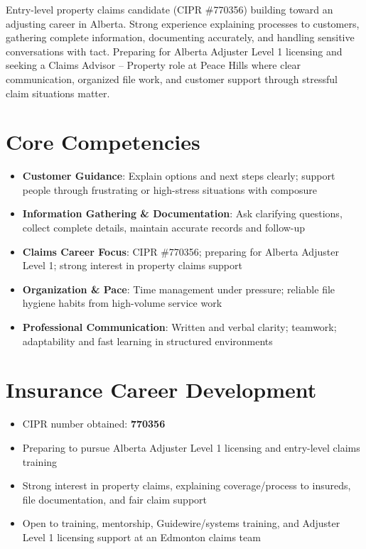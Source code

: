 \documentclass[11pt,a4paper,sans]{moderncv}
\begin{document}
\makecvtitle

\vspace{6pt}
\small{Entry-level property claims candidate (CIPR \#770356) building toward an adjusting career in Alberta. Strong experience explaining processes to customers, gathering complete information, documenting accurately, and handling sensitive conversations with tact. Preparing for Alberta Adjuster Level 1 licensing and seeking a Claims Advisor – Property role at Peace Hills where clear communication, organized file work, and customer support through stressful claim situations matter.}

\section{Core Competencies}
\vspace{1pt}
\begin{itemize}
\item \textbf{Customer Guidance}: Explain options and next steps clearly; support people through frustrating or high-stress situations with composure
\item \textbf{Information Gathering \& Documentation}: Ask clarifying questions, collect complete details, maintain accurate records and follow-up
\item \textbf{Claims Career Focus}: CIPR \#770356; preparing for Alberta Adjuster Level 1; strong interest in property claims support
\item \textbf{Organization \& Pace}: Time management under pressure; reliable file hygiene habits from high-volume service work
\item \textbf{Professional Communication}: Written and verbal clarity; teamwork; adaptability and fast learning in structured environments
\end{itemize}

\section{Insurance Career Development}
\vspace{1pt}
\begin{itemize}
\item CIPR number obtained: \textbf{770356}
\item Preparing to pursue Alberta Adjuster Level 1 licensing and entry-level claims training
\item Strong interest in property claims, explaining coverage/process to insureds, file documentation, and fair claim support
\item Open to training, mentorship, Guidewire/systems training, and Adjuster Level 1 licensing support at an Edmonton claims team
\end{itemize}
\end{document}
